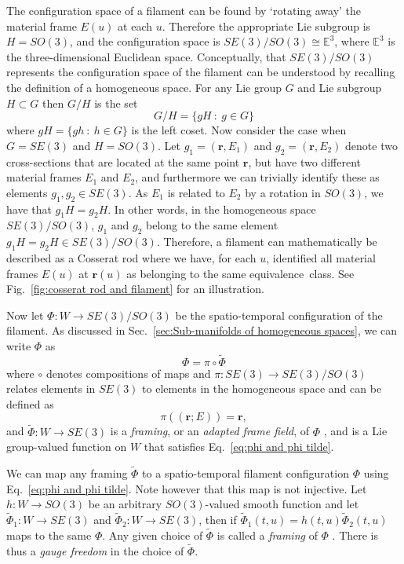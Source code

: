 The configuration space of a filament can be found by `rotating away' the material frame $E(u)$ at each $u$. Therefore the appropriate Lie subgroup is $H = SO(3)$, and the configuration space is $SE(3) / SO(3) \cong \mathbb{E}^3$, where $\mathbb{E}^3$ is the three-dimensional Euclidean space. Conceptually, that $SE(3)/SO(3)$ represents the configuration space of the filament can be understood by recalling the definition of a homogeneous space. For any Lie group $G$ and Lie subgroup $H \subset G$ then $G/H$ is the set
\begin{equation}
G / H = \{ gH\ :\ g \in G \}
\end{equation}
where $gH = \{ gh\ :\ h \in G \}$ is the left coset. Now consider the case when $G = SE(3)$ and $H = SO(3)$. Let $g_1 = (\mathbf{r}, E_1)$ and $g_2 = (\mathbf{r}, E_2)$ denote two cross-sections that are located at the same point $\mathbf{r}$, but have two different material frames $E_1$ and $E_2$, and furthermore we can trivially identify these as elements $g_1, g_2 \in SE(3)$. As $E_1$ is related to $E_2$ by a rotation in $SO(3)$, we have that $g_1 H = g_2 H$. In other words, in the homogeneous space $SE(3)/SO(3)$, $g_1$ and $g_2$ belong to the same element $g_1 H = g_2 H \in SE(3)/SO(3)$. Therefore, a filament can mathematically be described as a Cosserat rod where we have, for each $u$, identified all material frames $E(u)$ at $\mathbf{r}(u)$ as belonging to the same equivalence~class. See Fig.~\ref{fig:cosserat rod and filament} for an illustration.

Now let $\Phi : W \to SE(3)/SO(3)$ be the spatio-temporal configuration of the filament. As discussed in Sec.~\ref{sec:Sub-manifolds of homogeneous spaces}, we can write $\Phi$ as
\begin{equation} \label{eq:phi and phi tilde}
\Phi = \pi \circ \tilde{\Phi}
\end{equation}
where $\circ$ denotes compositions of maps and $\pi : SE(3) \to SE(3)/SO(3)$ relates elements in $SE(3)$ to elements in the homogeneous space and can be defined as
\begin{equation}
\pi( (\mathbf{r} ; E) ) = \mathbf{r},
\end{equation}
and $\tilde{\Phi} : W \to SE(3)$ is a \textit{framing}, or an \textit{adapted frame field}, of $\Phi$ \citep{clellandFrenetCartanMethod2017}, and is a Lie group-valued function on $W$ that satisfies Eq.~\ref{eq:phi and phi tilde}.

We can map any framing $\tilde{\Phi}$ to a spatio-temporal filament configuration $\Phi$ using Eq.~\ref{eq:phi and phi tilde}. Note however that this map is not injective. Let $h : W \to SO(3)$ be an arbitrary $SO(3)$-valued smooth function and let $\tilde{\Phi}_1 : W \to SE(3)$ and $\tilde{\Phi}_2 : W \to SE(3)$, then if $\tilde{\Phi}_1(t,u) = h(t,u) \tilde{\Phi}_2(t,u)$ maps to the same $\Phi$. Any given choice of $\tilde{\Phi}$ is called a \textit{framing} of $\Phi$ \citep{clellandFrenetCartanMethod2017}. There is thus a \textit{gauge freedom} in the choice of $\tilde{\Phi}$.

